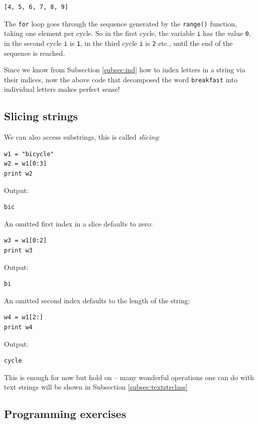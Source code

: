 \begin{verbatim}
[4, 5, 6, 7, 8, 9]
\end{verbatim}
The {\tt for} loop goes through the sequence generated by the {\tt range()} function, 
taking one element per cycle. So in the first cycle, the variable {\tt i}
has the value {\tt 0}, in the second cycle {\tt i} is {\tt 1}, in the third cycle 
{\tt i} is {\tt 2} etc., until the end of the sequence is reached. 

Since we know from Subsection \ref{subsec:ind} 
how to index letters in a string via their indices, now the above 
code that decomposed the word {\tt breakfast} into individual letters
makes perfect sense!

\subsection{Slicing strings}

We can also access substrings, this is called {\em slicing}:

\begin{verbatim}
w1 = "bicycle"
w2 = w1[0:3]
print w2
\end{verbatim}
Output:

\begin{verbatim}
bic
\end{verbatim}
An omitted first index in a slice defaults to zero:

\begin{verbatim}
w3 = w1[0:2]
print w3
\end{verbatim}
Output:

\begin{verbatim}
bi
\end{verbatim}
An omitted second index defaults to the length of the string:

\begin{verbatim}
w4 = w1[2:]
print w4
\end{verbatim}
Output:

\begin{verbatim}
cycle
\end{verbatim}
This is enough for now but hold on -- many wonderful operations one 
can do with text strings will be shown in Subsection \ref{subsec:textstrclass}



\subsection{Programming exercises}

